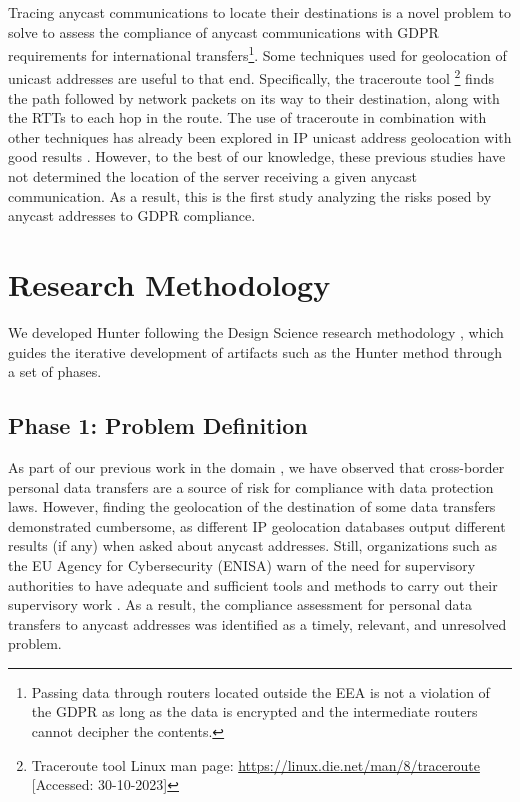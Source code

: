 \documentclass[preprint,12pt]{elsarticle}
\begin{document}
Tracing anycast communications to locate their destinations is a novel problem to solve to assess the compliance of anycast communications with GDPR requirements for international transfers\footnote{Passing data through routers located outside the EEA is not a violation of the GDPR as long as the data is encrypted and the intermediate routers cannot decipher the contents.}. Some techniques used for geolocation of unicast addresses are useful to that end. Specifically, the traceroute tool \footnote{Traceroute tool Linux man page: \url{https://linux.die.net/man/8/traceroute} [Accessed: 30-10-2023]} finds the path followed by network packets on its way to their destination, along with the RTTs to each hop in the route. The use of traceroute in combination with other techniques has already been explored in IP unicast address geolocation with good results \cite{Dan2021IPInterpolation, Ciavarrini2018GeolocationBound, Cicalese2016Latency-BasedSets}. However, to the best of our knowledge, these previous studies have not determined the location of the server receiving a given anycast communication. As a result, this is the first study analyzing the risks posed by anycast addresses to GDPR compliance.

\section{Research Methodology}
We developed Hunter following the Design Science research methodology \cite{Hevner2004DesignResearch}, which guides the iterative development of artifacts such as the Hunter method through a set of phases.

\subsection{Phase 1: Problem Definition}
As part of our previous work in the domain \cite{Guaman2021GDPRApps, Guaman2023AutomatedApplications}, we have observed that cross-border personal data transfers are a source of risk for compliance with data protection laws. However, finding the geolocation of the destination of some data transfers demonstrated cumbersome, as different IP geolocation databases output different results (if any) when asked about anycast addresses. Still, organizations such as the EU Agency for Cybersecurity (ENISA) warn of the need for supervisory authorities to have adequate and sufficient tools and methods to carry out their supervisory work \cite{EuropeanUnion.AgencyforNetworkandInformationSecurity.PrivacyGDPR.}. As a result, the compliance assessment for personal data transfers to anycast addresses was identified as a timely, relevant, and unresolved problem. 
\end{document}
